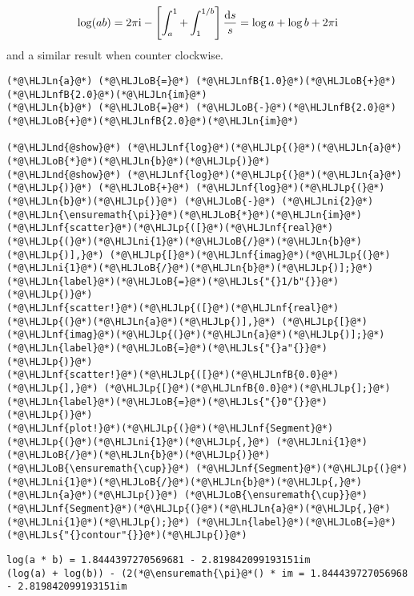 \documentclass[12pt,a4paper]{article}
\newcommand{\HLJLn}[1]{#1}
\newcommand{\HLJLnd}[1]{\textcolor[RGB]{214,102,97}{#1}}
\newcommand{\HLJLnf}[1]{\textcolor[RGB]{66,102,213}{#1}}
\newcommand{\HLJLs}[1]{\textcolor[RGB]{201,61,57}{#1}}
\newcommand{\HLJLnfB}[1]{\textcolor[RGB]{59,151,46}{#1}}
\newcommand{\HLJLni}[1]{\textcolor[RGB]{59,151,46}{#1}}
\newcommand{\HLJLoB}[1]{\textcolor[RGB]{102,102,102}{\textbf{#1}}}
\newcommand{\HLJLp}[1]{#1}
\def\D{ {\rm d} }
\def\I{ {\rm i} }
\begin{document}
\[
\log(ab) = 2 \pi \I - \left[\int_a^1 +\int_1^{1/b} \right] {\D s \over s} = \log a + \log b + 2\pi \I
\]
and a similar result when counter clockwise.


\begin{lstlisting}
(*@\HLJLn{a}@*) (*@\HLJLoB{=}@*) (*@\HLJLnfB{1.0}@*)(*@\HLJLoB{+}@*)(*@\HLJLnfB{2.0}@*)(*@\HLJLn{im}@*)
(*@\HLJLn{b}@*) (*@\HLJLoB{=}@*) (*@\HLJLoB{-}@*)(*@\HLJLnfB{2.0}@*)(*@\HLJLoB{+}@*)(*@\HLJLnfB{2.0}@*)(*@\HLJLn{im}@*)

(*@\HLJLnd{@show}@*) (*@\HLJLnf{log}@*)(*@\HLJLp{(}@*)(*@\HLJLn{a}@*)(*@\HLJLoB{*}@*)(*@\HLJLn{b}@*)(*@\HLJLp{)}@*)
(*@\HLJLnd{@show}@*) (*@\HLJLnf{log}@*)(*@\HLJLp{(}@*)(*@\HLJLn{a}@*)(*@\HLJLp{)}@*) (*@\HLJLoB{+}@*) (*@\HLJLnf{log}@*)(*@\HLJLp{(}@*)(*@\HLJLn{b}@*)(*@\HLJLp{)}@*) (*@\HLJLoB{-}@*) (*@\HLJLni{2}@*)(*@\HLJLn{\ensuremath{\pi}}@*)(*@\HLJLoB{*}@*)(*@\HLJLn{im}@*)
(*@\HLJLnf{scatter}@*)(*@\HLJLp{([}@*)(*@\HLJLnf{real}@*)(*@\HLJLp{(}@*)(*@\HLJLni{1}@*)(*@\HLJLoB{/}@*)(*@\HLJLn{b}@*)(*@\HLJLp{)],}@*) (*@\HLJLp{[}@*)(*@\HLJLnf{imag}@*)(*@\HLJLp{(}@*)(*@\HLJLni{1}@*)(*@\HLJLoB{/}@*)(*@\HLJLn{b}@*)(*@\HLJLp{)];}@*) (*@\HLJLn{label}@*)(*@\HLJLoB{=}@*)(*@\HLJLs{"{}1/b"{}}@*)(*@\HLJLp{)}@*)
(*@\HLJLnf{scatter!}@*)(*@\HLJLp{([}@*)(*@\HLJLnf{real}@*)(*@\HLJLp{(}@*)(*@\HLJLn{a}@*)(*@\HLJLp{)],}@*) (*@\HLJLp{[}@*)(*@\HLJLnf{imag}@*)(*@\HLJLp{(}@*)(*@\HLJLn{a}@*)(*@\HLJLp{)];}@*) (*@\HLJLn{label}@*)(*@\HLJLoB{=}@*)(*@\HLJLs{"{}a"{}}@*)(*@\HLJLp{)}@*)
(*@\HLJLnf{scatter!}@*)(*@\HLJLp{([}@*)(*@\HLJLnfB{0.0}@*)(*@\HLJLp{],}@*) (*@\HLJLp{[}@*)(*@\HLJLnfB{0.0}@*)(*@\HLJLp{];}@*) (*@\HLJLn{label}@*)(*@\HLJLoB{=}@*)(*@\HLJLs{"{}0"{}}@*)(*@\HLJLp{)}@*)
(*@\HLJLnf{plot!}@*)(*@\HLJLp{(}@*)(*@\HLJLnf{Segment}@*)(*@\HLJLp{(}@*)(*@\HLJLni{1}@*)(*@\HLJLp{,}@*) (*@\HLJLni{1}@*)(*@\HLJLoB{/}@*)(*@\HLJLn{b}@*)(*@\HLJLp{)}@*) (*@\HLJLoB{\ensuremath{\cup}}@*) (*@\HLJLnf{Segment}@*)(*@\HLJLp{(}@*)(*@\HLJLni{1}@*)(*@\HLJLoB{/}@*)(*@\HLJLn{b}@*)(*@\HLJLp{,}@*) (*@\HLJLn{a}@*)(*@\HLJLp{)}@*) (*@\HLJLoB{\ensuremath{\cup}}@*) (*@\HLJLnf{Segment}@*)(*@\HLJLp{(}@*)(*@\HLJLn{a}@*)(*@\HLJLp{,}@*) (*@\HLJLni{1}@*)(*@\HLJLp{);}@*) (*@\HLJLn{label}@*)(*@\HLJLoB{=}@*)(*@\HLJLs{"{}contour"{}}@*)(*@\HLJLp{)}@*)
\end{lstlisting}

\begin{lstlisting}
log(a * b) = 1.8444397270569681 - 2.819842099193151im
(log(a) + log(b)) - (2(*@\ensuremath{\pi}@*() * im = 1.844439727056968 - 2.819842099193151im
\end{lstlisting}
\end{document}
